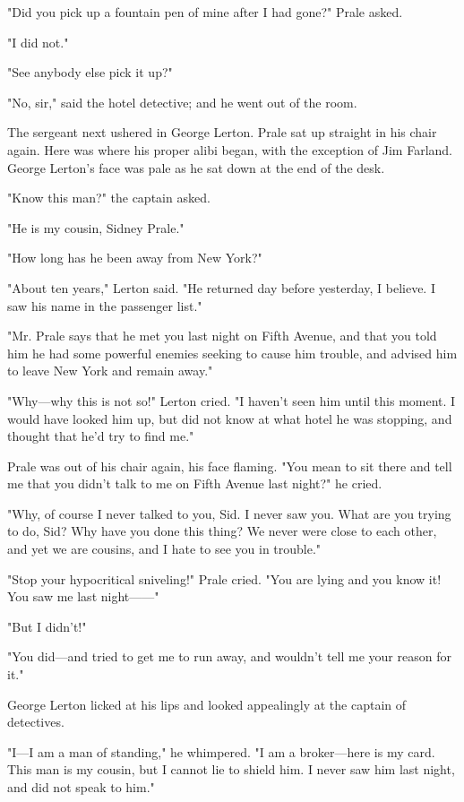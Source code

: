 \documentclass{novel}
\begin{document}
"Did you pick up a fountain pen of mine after I had gone?" Prale asked.

"I did not."

"See anybody else pick it up?"

"No, sir," said the hotel detective; and he went out of the room.

The sergeant next ushered in George Lerton. Prale sat up straight in his chair again. Here was where his proper alibi began, with the exception of Jim Farland. George Lerton's face was pale as he sat down at the end of the desk.

"Know this man?" the captain asked.

"He is my cousin, Sidney Prale."

"How long has he been away from New York?"

"About ten years," Lerton said. "He returned day before yesterday, I believe. I saw his name in the passenger list."

"Mr. Prale says that he met you last night on Fifth Avenue, and that you told him he had some powerful enemies seeking to cause him trouble, and advised him to leave New York and remain away."

"Why---why this is not so!" Lerton cried. "I haven't seen him until this moment. I would have looked him up, but did not know at what hotel he was stopping, and thought that he'd try to find me."

Prale was out of his chair again, his face flaming. "You mean to sit there and tell me that you didn't talk to me on Fifth Avenue last night?" he cried.

"Why, of course I never talked to you, Sid. I never saw you. What are you trying to do, Sid? Why have you done this thing? We never were close to each other, and yet we are cousins, and I hate to see you in trouble."

"Stop your hypocritical sniveling!" Prale cried. "You are lying and you know it! You saw me last night------"

"But I didn't!"

"You did---and tried to get me to run away, and wouldn't tell me your reason for it."

George Lerton licked at his lips and looked appealingly at the captain of detectives.

"I---I am a man of standing," he whimpered. "I am a broker---here is my card. This man is my cousin, but I cannot lie to shield him. I never saw him last night, and did not speak to him."
\end{document}

